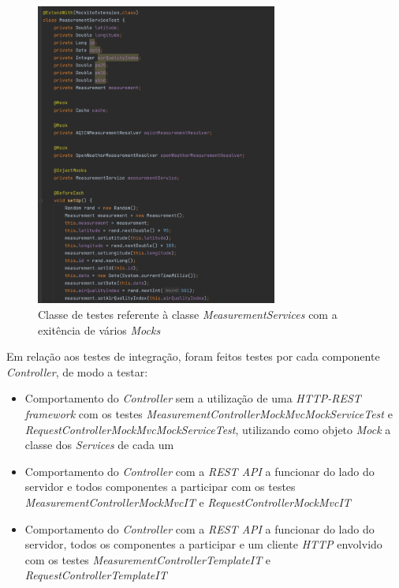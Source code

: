 \documentclass[10pt,english]{article}
\begin{document}
\begin{figure}[h]
    \centering
    \includegraphics[width=300]{images/measurements-services-tests.png}
    \caption{Classe de testes referente à classe \textit{MeasurementServices} com a exitência de vários \textit{Mocks}}
\end{figure}

\clearpage

\par Em relação aos testes de integração, foram feitos testes por cada componente \textit{Controller}, de modo a testar:

\begin{itemize}
    \item Comportamento do \textit{Controller} sem a utilização de uma \textit{HTTP-REST framework} com os testes \textit{MeasurementControllerMockMvcMockServiceTest} e \textit{RequestControllerMockMvcMockServiceTest}, utilizando como objeto \textit{Mock} a classe dos \textit{Services} de cada um
    
    \item Comportamento do \textit{Controller} com a \textit{REST API} a funcionar do lado do servidor e todos componentes a participar com os testes \textit{MeasurementControllerMockMvcIT} e \textit{RequestControllerMockMvcIT}
    
    \item Comportamento do \textit{Controller} com a \textit{REST API} a funcionar do lado do servidor, todos os componentes a participar e um cliente \textit{HTTP} envolvido com os testes \textit{MeasurementControllerTemplateIT} e \textit{RequestControllerTemplateIT}
\end{itemize}
\end{document}
